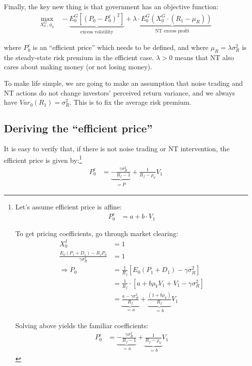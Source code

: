 \documentclass[12pt]{article}
\begin{document}
Finally, the key new thing is that government has an objective function:
\begin{align}
    \max_{X_0^G, \phi_0} & ~ - \underbrace{E_0^G[(P_0 - P_0^e)^2]}_\text{excess volatility} + \underbrace{\lambda \cdot E_0^G(X_0^G \cdot (R_1 - \mu_R))}_\text{NT excess profit} \label{new:nt_objective}
\end{align}

\noindent where $P_0^e$ is an ``efficient price'' which needs to be defined, and where $\mu_R = \lambda \sigma_R^2$ is the steady-state risk premium in the efficient case. $\lambda > 0$ means that NT also cares about making money (or not losing money). 

To make life simple, we are going to make an assumption that noise trading and NT actions do not change investors' perceived return variance, and we always have $Var_0(R_1) = \sigma_R^2$. This is to fix the average risk premium. 

\subsection{Deriving the ``efficient price''}

It is easy to verify that, if there is not noise trading or NT intervention, the efficient price is given by:\footnote{
Let's assume efficient price is affine:
\begin{align*}
    P_0^e & = a + b \cdot V_1
\end{align*}

To get pricing coefficients, go through market clearing:
\begin{align*}
    X_0^I& = 1 \\
    \frac{E_0(P_1 + D_1) - R_f P_0}{\gamma \sigma_R^2} & = 1 \\
    \Rightarrow P_0 & = \frac{1}{R_f} \left[E_0(P_1 + D_1) - \gamma \sigma_R^2 \right] \\
    & = \frac{1}{R_f} \cdot \left[a + b \rho_V V_1 + V_1 - \gamma \sigma_R^2 \right] \\
    & = \underbrace{\frac{a-\gamma \sigma_R^2}{R_f}}_{=a} + \underbrace{\frac{(1+b \rho_V)}{R_f}}_{=b} V_1
\end{align*}

Solving above yields the familiar coefficients:
\begin{align*}
P_0^e & = \underbrace{- \frac{\gamma \sigma_R^2}{R_f - 1}}_{=a} + \underbrace{\frac{1}{R_f - \rho_V}}_{=b} V_1
\end{align*}
}
\begin{align*}
    P_0^e & = \underbrace{-\frac{\gamma \sigma_R^2}{R_f - 1}}_{=\bar{P}} + \frac{1}{R_f - \rho_V} V_1
\end{align*}
\end{document}
